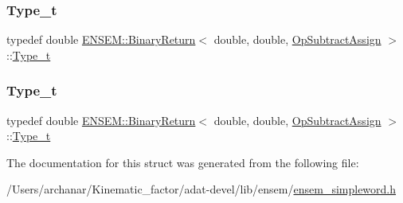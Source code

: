 \mbox{\label{structENSEM_1_1BinaryReturn_3_01double_00_01double_00_01OpSubtractAssign_01_4_ace697e1191a85ef3c635e6d0d147e1b3}} 
\subsubsection{\texorpdfstring{Type\_t}{Type\_t}\hspace{0.1cm}{\footnotesize\ttfamily [2/3]}}
{\footnotesize\ttfamily typedef double \mbox{\hyperlink{structENSEM_1_1BinaryReturn}{E\+N\+S\+E\+M\+::\+Binary\+Return}}$<$ double, double, \mbox{\hyperlink{structENSEM_1_1OpSubtractAssign}{Op\+Subtract\+Assign}} $>$\+::\mbox{\hyperlink{structENSEM_1_1BinaryReturn_3_01double_00_01double_00_01OpSubtractAssign_01_4_ace697e1191a85ef3c635e6d0d147e1b3}{Type\+\_\+t}}}

\mbox{\label{structENSEM_1_1BinaryReturn_3_01double_00_01double_00_01OpSubtractAssign_01_4_ace697e1191a85ef3c635e6d0d147e1b3}} 
\subsubsection{\texorpdfstring{Type\_t}{Type\_t}\hspace{0.1cm}{\footnotesize\ttfamily [3/3]}}
{\footnotesize\ttfamily typedef double \mbox{\hyperlink{structENSEM_1_1BinaryReturn}{E\+N\+S\+E\+M\+::\+Binary\+Return}}$<$ double, double, \mbox{\hyperlink{structENSEM_1_1OpSubtractAssign}{Op\+Subtract\+Assign}} $>$\+::\mbox{\hyperlink{structENSEM_1_1BinaryReturn_3_01double_00_01double_00_01OpSubtractAssign_01_4_ace697e1191a85ef3c635e6d0d147e1b3}{Type\+\_\+t}}}



The documentation for this struct was generated from the following file\+:\begin{DoxyCompactItemize}
\item 
/\+Users/archanar/\+Kinematic\+\_\+factor/adat-\/devel/lib/ensem/\mbox{\hyperlink{adat-devel_2lib_2ensem_2ensem__simpleword_8h}{ensem\+\_\+simpleword.\+h}}\end{DoxyCompactItemize}

